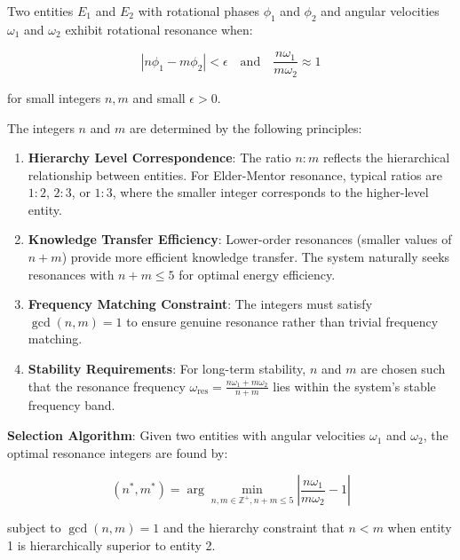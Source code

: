 \begin{definition}
Two entities $E_1$ and $E_2$ with rotational phases $\phi_1$ and $\phi_2$ and angular velocities $\omega_1$ and $\omega_2$ exhibit rotational resonance when:

\begin{equation}
|n\phi_1 - m\phi_2| < \epsilon \quad \text{and} \quad \frac{n\omega_1}{m\omega_2} \approx 1
\end{equation}

for small integers $n, m$ and small $\epsilon > 0$.

The integers $n$ and $m$ are determined by the following principles:

\begin{enumerate}
    \item \textbf{Hierarchy Level Correspondence}: The ratio $n:m$ reflects the hierarchical relationship between entities. For Elder-Mentor resonance, typical ratios are $1:2$, $2:3$, or $1:3$, where the smaller integer corresponds to the higher-level entity.
    
    \item \textbf{Knowledge Transfer Efficiency}: Lower-order resonances (smaller values of $n+m$) provide more efficient knowledge transfer. The system naturally seeks resonances with $n+m \leq 5$ for optimal energy efficiency.
    
    \item \textbf{Frequency Matching Constraint}: The integers must satisfy $\gcd(n,m) = 1$ to ensure genuine resonance rather than trivial frequency matching.
    
    \item \textbf{Stability Requirements}: For long-term stability, $n$ and $m$ are chosen such that the resonance frequency $\omega_{\text{res}} = \frac{n\omega_1 + m\omega_2}{n+m}$ lies within the system's stable frequency band.
\end{enumerate}

\textbf{Selection Algorithm}: Given two entities with angular velocities $\omega_1$ and $\omega_2$, the optimal resonance integers are found by:

\begin{equation}
(n^*, m^*) = \arg\min_{n,m \in \mathbb{Z}^+, n+m \leq 5} \left|\frac{n\omega_1}{m\omega_2} - 1\right|
\end{equation}

subject to $\gcd(n,m) = 1$ and the hierarchy constraint that $n < m$ when entity 1 is hierarchically superior to entity 2.
\end{definition}

